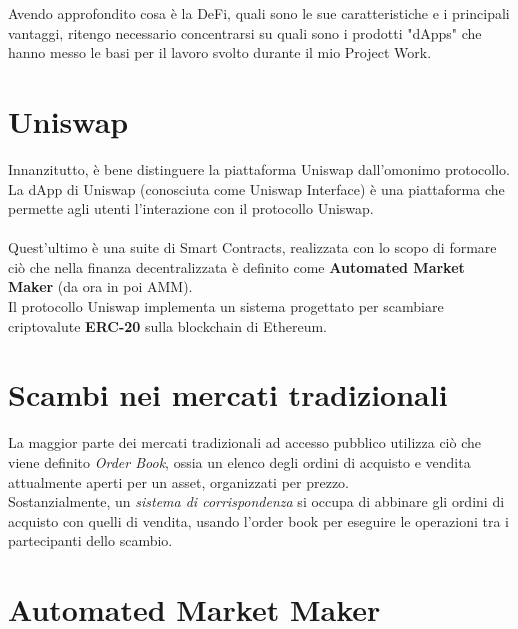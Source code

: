 \documentclass[12pt,a4paper]{report}
\begin{document}
Avendo approfondito cosa è la DeFi, quali sono le sue caratteristiche e i principali vantaggi, ritengo necessario concentrarsi su quali sono i prodotti "dApps" che hanno messo le basi per il lavoro svolto durante il mio Project Work.

\section{Uniswap}

Innanzitutto, è bene distinguere la piattaforma Uniswap\cite{uniswap} dall'omonimo protocollo.
\\La dApp di Uniswap (conosciuta come Uniswap Interface) è una piattaforma che permette agli utenti l'interazione con il protocollo Uniswap.
\\\\Quest'ultimo è una suite di Smart Contracts, realizzata con lo scopo di formare ciò che nella finanza decentralizzata è definito come \textbf{Automated Market Maker} (da ora in poi AMM\cite{amm}).
\\Il protocollo Uniswap implementa un sistema progettato per scambiare criptovalute \textbf{ERC-20} sulla blockchain di Ethereum. 
\section{Scambi nei mercati tradizionali}

La maggior parte dei mercati tradizionali ad accesso pubblico utilizza ciò che viene definito \textit{Order Book}\cite{order_book}, ossia un elenco degli ordini di acquisto e vendita attualmente aperti per un asset, organizzati per prezzo.
\\Sostanzialmente, un \textit{sistema di corrispondenza}\cite{matching} si occupa di abbinare gli ordini di acquisto con quelli di vendita, usando l'order book per eseguire le operazioni tra i partecipanti dello scambio.


\section{Automated Market Maker}
\end{document}
